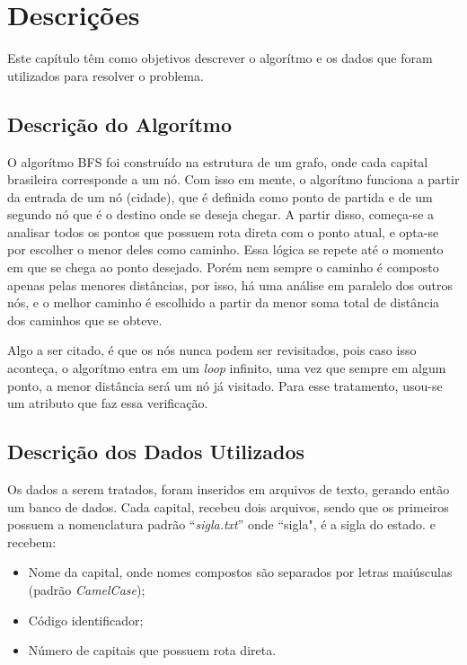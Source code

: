 \chapter*[Descrições]{Descrições}

Este capítulo têm como objetivos descrever o algorítmo e os dados que foram utilizados para resolver o problema.

\section{Descrição do Algorítmo}

O algorítmo BFS foi construído na estrutura de um grafo, onde cada capital brasileira corresponde a um nó. 
Com isso em mente, o algorítmo funciona a partir da entrada de um nó (cidade), que é definida como ponto de 
partida e de um segundo nó que é o destino onde se deseja chegar. A partir disso, começa-se a analisar 
todos os pontos que possuem rota direta com o ponto atual, e opta-se por escolher o menor deles como 
caminho. Essa lógica se repete até o momento em que se chega ao ponto desejado. Porém nem sempre o caminho 
é composto apenas pelas menores distâncias, por isso, há uma análise em paralelo dos outros nós, e o melhor 
caminho é escolhido a partir da menor soma total de distância dos caminhos que se obteve.

Algo a ser citado, é que os nós nunca podem ser revisitados, pois caso isso aconteça, o algorítmo entra em 
um \textit{loop} infinito, uma vez que sempre em algum ponto, a menor distância será um nó já visitado. 
Para esse tratamento, usou-se um atributo que faz essa verificação. 

\section{Descrição dos Dados Utilizados}

Os dados a serem tratados, foram inseridos em arquivos de texto, gerando então um banco de dados. Cada 
capital, recebeu dois arquivos, sendo que os primeiros possuem a nomenclatura padrão ``\textit{sigla.txt}'' onde ``sigla", é a sigla do estado.
e recebem: 

\begin{itemize}
 	\item Nome da capital, onde nomes compostos são separados por letras maiúsculas (padrão \textit{CamelCase});
    \item Código identificador;
	\item Número de capitais que possuem rota direta. 
\end{itemize}

